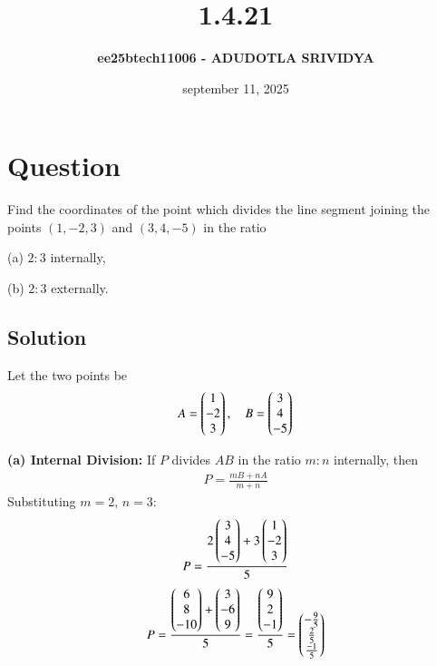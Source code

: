 \documentclass[12pt]{article}
\title{\textbf{1.4.21}}
\author{\textbf{ee25btech11006 - ADUDOTLA SRIVIDYA}}
\date {september 11, 2025}
\begin{document}
\maketitle

\section*{Question}
Find the coordinates of the point which divides the line segment joining the points $(1,-2,3)$ and $(3,4,-5)$ in the ratio  

(a) $2:3$ internally,  

(b) $2:3$ externally.  

\subsection*{Solution}

Let the two points be  
\begin{align}
A = \begin{pmatrix}1 \\ -2 \\ 3\end{pmatrix}, \quad B = \begin{pmatrix}3 \\ 4 \\ -5\end{pmatrix}
\end{align}

\textbf{(a) Internal Division:}  
If $P$ divides $AB$ in the ratio $m:n$ internally, then
\begin{align}
P = \frac{mB+nA}{m+n}
\end{align}
Substituting $m=2$, $n=3$:
\begin{align}
P = \frac{2\begin{pmatrix}3 \\ 4 \\ -5\end{pmatrix} + 3\begin{pmatrix}1 \\ -2 \\ 3\end{pmatrix}}{5}
\end{align}
\begin{align}
P = \frac{\begin{pmatrix}6 \\ 8 \\ -10\end{pmatrix} + \begin{pmatrix}3 \\ -6 \\ 9\end{pmatrix}}{5}
= \frac{\begin{pmatrix}9 \\ 2 \\ -1\end{pmatrix}}{5}
= \begin{pmatrix}-\tfrac{9}{5} \\ \tfrac{2}{5} \\ \tfrac{-1}{5}\end{pmatrix}
\end{align}
\end{document}
